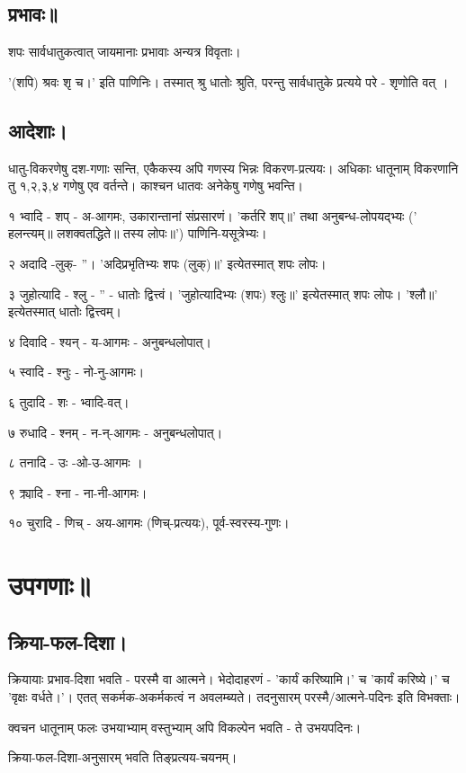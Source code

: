 \documentclass[oneside, article]{memoir}
\begin{document}
\subsection{प्रभावः॥}
शपः सार्वधातुकत्वात् जायमानाः प्रभावाः अन्यत्र विवृताः।

'(शपि) श्रवः शृ च।' इति पाणिनिः। तस्मात् श्रु धातोः श्रुति, परन्तु सार्वधातुके प्रत्यये परे - शृणोति वत् ।

\subsection{आदेशाः।}
धातु-विकरणेषु दश-गणाः सन्ति, एकैकस्य अपि गणस्य भिन्नः विकरण-प्रत्ययः। अधिकाः धातूनाम् विकरणानि तु १,२,३,४ गणेषु एव वर्तन्ते। काश्चन धातवः अनेकेषु गणेषु भवन्ति।

१ भ्वादि - शप् - अ-आगमः, उकारान्तानां संप्रसारणं। 'कर्तरि शप्॥' तथा अनुबन्ध-लोपयद्भ्यः (' हलन्त्यम्॥ लशक्वतद्धिते॥ तस्य लोपः॥') पाणिनि-यसूत्रेभ्यः।

२ अदादि -लुक्- ''। 'अदिप्रभृतिभ्यः शपः (लुक्)॥' इत्येतस्मात् शपः लोपः।

३ जुहोत्यादि - श्लु - '' - धातोः द्वित्त्वं। 'जुहोत्यादिभ्यः (शपः) श्लुः॥' इत्येतस्मात्   शपः लोपः। 'श्लौ॥' इत्येतस्मात् धातोः द्वित्त्वम्।

४ दिवादि - श्यन् - य-आगमः - अनुबन्धलोपात्।

५ स्वादि - श्नुः - नो-नु-आगमः।

६ तुदादि - शः - भ्वादि-वत्।

७ रुधादि - श्नम् - न-न्-आगमः - अनुबन्धलोपात्।

८ तनादि - उः -ओ-उ-आगमः ।

९ क्र्यादि - श्ना - ना-नी-आगमः।

१० चुरादि  - णिच् - अय-आगमः (णिच्-प्रत्ययः), पूर्व-स्वरस्य-गुणः।

\section{उपगणाः॥}
\subsection{क्रिया-फल-दिशा।}
क्रियायाः प्रभाव-दिशा भवति - परस्मै वा आत्मने। भेदोदाहरणं - 'कार्यं करिष्यामि।' च 'कार्यं करिष्ये।' च 'वृक्षः वर्धते।'। एतत् सकर्मक-अकर्मकत्वं न अवलम्ब्यते। तदनुसारम् परस्मै/आत्मने-पदिनः इति विभक्ताः।

क्वचन धातूनाम् फलः उभयाभ्याम् वस्तुभ्याम् अपि विकल्पेन भवति - ते उभयपदिनः।

क्रिया-फल-दिशा-अनुसारम् भवति तिङ्प्रत्यय-चयनम्।
\end{document}
